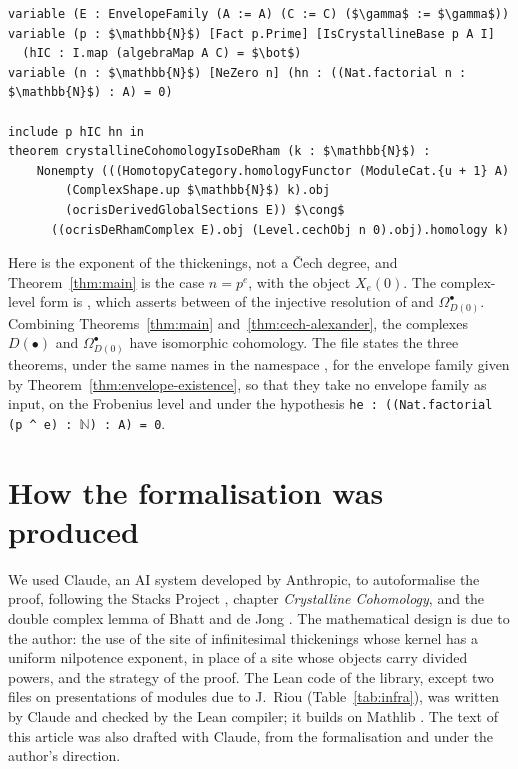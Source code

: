 \documentclass[11pt]{amsart}
\theoremstyle{plain}
\theoremstyle{definition}
\theoremstyle{remark}
\begin{document}
\begin{lstlisting}
variable (E : EnvelopeFamily (A := A) (C := C) ($\gamma$ := $\gamma$))
variable (p : $\mathbb{N}$) [Fact p.Prime] [IsCrystallineBase p A I]
  (hIC : I.map (algebraMap A C) = $\bot$)
variable (n : $\mathbb{N}$) [NeZero n] (hn : ((Nat.factorial n : $\mathbb{N}$) : A) = 0)

include p hIC hn in
theorem crystallineCohomologyIsoDeRham (k : $\mathbb{N}$) :
    Nonempty (((HomotopyCategory.homologyFunctor (ModuleCat.{u + 1} A)
        (ComplexShape.up $\mathbb{N}$) k).obj
        (ocrisDerivedGlobalSections E)) $\cong$
      ((ocrisDeRhamComplex E).obj (Level.cechObj n 0).obj).homology k)
\end{lstlisting}

Here  is the exponent of the thickenings, not a Čech degree, and Theorem~\ref{thm:main} is the case $n = p^e$, with  the object $X_e(0)$. The complex-level form is , which asserts  between  of the injective resolution of  and $\Omega^\bullet_{D(0)}$. Combining Theorems~\ref{thm:main} and~\ref{thm:cech-alexander}, the complexes $D(\bullet)$ and $\Omega^\bullet_{D(0)}$ have isomorphic cohomology. The file  states the three theorems, under the same names in the namespace , for the envelope family  given by Theorem~\ref{thm:envelope-existence}, so that they take no envelope family as input, on the Frobenius level  and under the hypothesis \texttt{he : ((Nat.factorial (p \textasciicircum{} e) : $\mathbb{N}$) : A) = 0}.

\section{How the formalisation was produced}\label{sec:produced}

We used Claude, an AI system developed by Anthropic, to autoformalise the proof, following the Stacks Project \cite{stacks}, chapter \emph{Crystalline Cohomology}, and the double complex lemma of Bhatt and de Jong \cite{bhatt-dejong}. The mathematical design is due to the author: the use of the site of infinitesimal thickenings whose kernel has a uniform nilpotence exponent, in place of a site whose objects carry divided powers, and the strategy of the proof. The Lean code of the library, except two files on presentations of modules due to J.~Riou (Table~\ref{tab:infra}), was written by Claude and checked by the Lean compiler; it builds on Mathlib \cite{mathlib}. The text of this article was also drafted with Claude, from the formalisation and under the author's direction.
\end{document}
